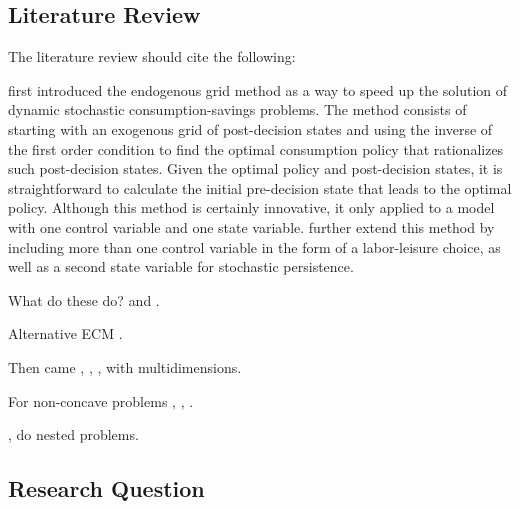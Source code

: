 \documentclass[\econtexRoot/SequentialEGM]{subfiles}
\begin{document}
\subsection{Literature Review} %


The literature review should cite the following:

\cite{Carroll2006-wq} first introduced the endogenous grid method as a way to speed up the solution of dynamic stochastic consumption-savings problems. The method consists of starting with an exogenous grid of post-decision states and using the inverse of the first order condition to find the optimal consumption policy that rationalizes such post-decision states. Given the optimal policy and post-decision states, it is straightforward to calculate the initial pre-decision state that leads to the optimal policy. Although this method is certainly innovative, it only applied to a model with one control variable and one state variable. \cite{Barillas2007-uh} further extend this method by including more than one control variable in the form of a labor-leisure choice, as well as a second state variable for stochastic persistence.

What do these do? \cite{Hintermaier2010-io} and \cite{Jorgensen2013-du}.

Alternative ECM \cite{Maliar2013-sv}.

Then came \cite{White2015-fg}, \cite{Iskhakov2015-jy}, \cite{Ludwig2018-uz},  with multidimensions.

For non-concave problems \cite{Fella2014-my},  \cite{Iskhakov2017-my}, \cite{Druedahl2017-vn}.

\cite{Clausen2020-zo},  \cite{Druedahl2021-wl} do nested problems.



\subsection{Research Question} %

\end{document}
